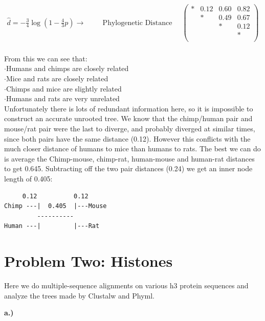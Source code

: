 \documentclass[10pt]{article} %
\begin{document}
\begin{align*}
  \hat{d} = -\frac{3}{4}\log\left(1-\frac{4}{3}p\right) \rightarrow \hspace{1cm}
  \mbox{Phylogenetic Distance}& \hspace{1cm}
  \begin{pmatrix}
    * & 0.12 & 0.60 & 0.82\\
    & * & 0.49 & 0.67\\
    & & * & 0.12\\
    & & & *\\
  \end{pmatrix}
\end{align*}\\

From this we can see that:\\
$\cdot$Humans and chimps are closely related\\
$\cdot$Mice and rats are closely related\\
$\cdot$Chimps and mice are slightly related\\
$\cdot$Humans and rats are very unrelated\\

Unfortunately there is lots of redundant information here, so it is impossible to construct
an accurate unrooted tree. We know that the chimp/human pair and mouse/rat pair were the last
to diverge, and probably diverged at similar times, since both pairs have the same distance (0.12).
However this conflicts with the much closer distance of humans to mice than humans to rats. The best
we can do is average the Chimp-mouse, chimp-rat, human-mouse and human-rat distances to get 0.645.
Subtracting off the two pair distances (0.24) we get an inner node length of 0.405:

\begin{verbatim}
     0.12          0.12
Chimp ---|  0.405  |---Mouse
         ----------
Human ---|         |---Rat
\end{verbatim}

\section{Problem Two: Histones}
Here we do multiple-sequence alignments on various h3 protein sequences and analyze the trees made
by Clustalw and Phyml.

\textbf{a.)}
\end{document}
